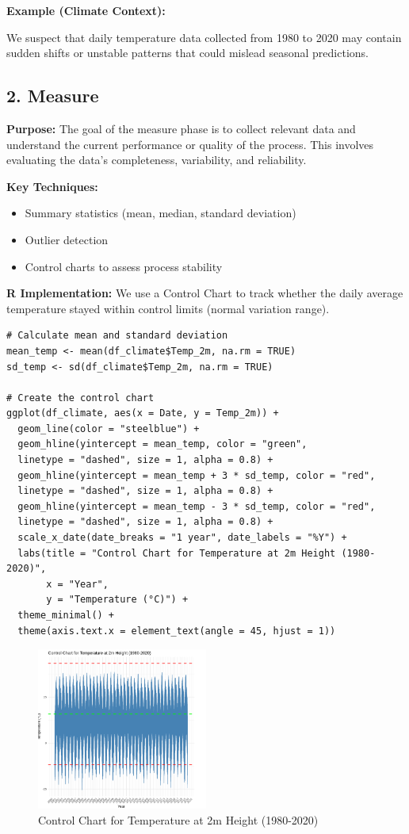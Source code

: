 \textbf{Example (Climate Context):} 

We suspect that daily temperature data collected from 1980 to 2020 may contain sudden shifts or unstable patterns that could mislead seasonal predictions.

\subsection*{2. Measure}

\textbf{Purpose:} The goal of the measure phase is to collect relevant data and understand the current performance or quality of the process. This involves evaluating the data’s completeness, variability, and reliability.

\textbf{Key Techniques:}
\begin{itemize}
  \item Summary statistics (mean, median, standard deviation)
  \item Outlier detection
  \item Control charts to assess process stability
\end{itemize}

\textbf{R Implementation:} We use a Control Chart to track whether the daily average temperature stayed within control limits (normal variation range).

\begin{verbatim}
# Calculate mean and standard deviation
mean_temp <- mean(df_climate$Temp_2m, na.rm = TRUE)
sd_temp <- sd(df_climate$Temp_2m, na.rm = TRUE)

# Create the control chart
ggplot(df_climate, aes(x = Date, y = Temp_2m)) +
  geom_line(color = "steelblue") +
  geom_hline(yintercept = mean_temp, color = "green", 
  linetype = "dashed", size = 1, alpha = 0.8) +
  geom_hline(yintercept = mean_temp + 3 * sd_temp, color = "red", 
  linetype = "dashed", size = 1, alpha = 0.8) +
  geom_hline(yintercept = mean_temp - 3 * sd_temp, color = "red", 
  linetype = "dashed", size = 1, alpha = 0.8) +
  scale_x_date(date_breaks = "1 year", date_labels = "%Y") +
  labs(title = "Control Chart for Temperature at 2m Height (1980-2020)",
       x = "Year",
       y = "Temperature (°C)") +
  theme_minimal() +
  theme(axis.text.x = element_text(angle = 45, hjust = 1))
\end{verbatim}

\begin{figure}[h]
\centering
\includegraphics[width=0.5\textwidth]{figures/control_chart.png}
\caption{Control Chart for Temperature at 2m Height (1980-2020)}
\end{figure}

